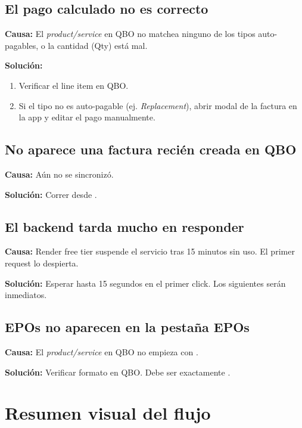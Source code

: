 \documentclass[11pt,a4paper]{article}
\begin{document}
\subsection{El pago calculado no es correcto}

\textbf{Causa:} El \textit{product/service} en QBO no matchea ninguno de los tipos auto-pagables, o la cantidad (Qty) está mal.

\textbf{Solución:}
\begin{enumerate}
  \item Verificar el line item en QBO.
  \item Si el tipo no es auto-pagable (ej. \textit{Replacement}), abrir modal de la factura en la app y editar el pago manualmente.
\end{enumerate}

\subsection{No aparece una factura recién creada en QBO}

\textbf{Causa:} Aún no se sincronizó.

\textbf{Solución:} Correr  desde .

\subsection{El backend tarda mucho en responder}

\textbf{Causa:} Render free tier suspende el servicio tras 15 minutos sin uso. El primer request lo despierta.

\textbf{Solución:} Esperar hasta 15 segundos en el primer click. Los siguientes serán inmediatos.

\subsection{EPOs no aparecen en la pestaña EPOs}

\textbf{Causa:} El \textit{product/service} en QBO no empieza con .

\textbf{Solución:} Verificar formato en QBO. Debe ser exactamente .

\section{Resumen visual del flujo}
\end{document}
